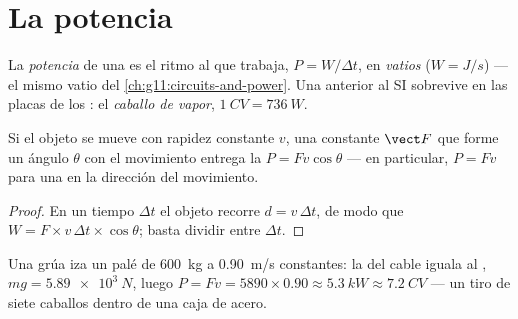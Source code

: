 \section{La potencia}

\begin{definition}[Potencia]\label{def:g11:work-of-force:power}
La \emph{potencia} de una  es el ritmo al
que trabaja, $P = W/\Delta t$, en \emph{vatios}
($\unit{W} = \unit{J/s}$) --- el mismo vatio del
\cref{ch:g11:circuits-and-power}. Una  anterior al SI sobrevive en
las placas de los : el \emph{caballo de vapor}, $\qty{1}{CV} = \qty{736}{W}$.
\end{definition}

\begin{proposition}\label{prop:g11:work-of-force:pfv}
Si el objeto se mueve con rapidez constante $v$, una  constante
$\vect F$ que forme un ángulo $\theta$ con el movimiento entrega la
 $P = F v \cos\theta$ --- en particular, $P = Fv$ para una
 en la dirección del movimiento.
\end{proposition}

\begin{proof}
En un tiempo $\Delta t$ el objeto recorre $d = v\,\Delta t$, de modo que
$W = F \times v\,\Delta t \times \cos\theta$; basta dividir entre
$\Delta t$.
\end{proof}

\begin{example}[Grúa]\label{ex:g11:work-of-force:crane}
Una grúa iza un palé de \qty{600}{kg} a \qty{0.90}{m/s} constantes: la
 del cable iguala al , $mg = \qty{5.89e3}{N}$, luego
$P = Fv = 5890 \times 0.90 \approx \qty{5.3}{kW} \approx \qty{7.2}{CV}$
--- un tiro de siete caballos dentro de una caja de acero.
\end{example}

